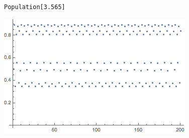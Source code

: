 \documentclass{hw}
\begin{document}
\begin{enumerate}
\begin{minipage}{0.5\textwidth}
\begin{verbatim}
Population[3.565]
\end{verbatim}
\end{minipage}
\begin{minipage}{0.5\textwidth}
\centering
\includegraphics[scale=0.5]{div16}
\end{minipage}

\end{enumerate}
\end{document}
